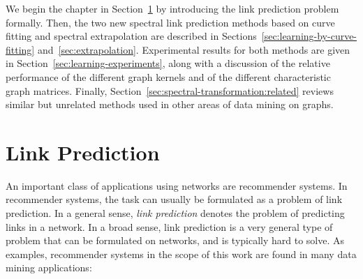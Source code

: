 \documentclass[11pt,a4paper]{book}
\begin{document}
We begin the chapter in Section~\ref{sec:link-prediction} by introducing
the link prediction problem formally.  Then, the two new spectral link
prediction methods based on curve fitting and spectral extrapolation are
described in Sections~\ref{sec:learning-by-curve-fitting} 
and~\ref{sec:extrapolation}.  Experimental results for both methods are
given in Section~\ref{sec:learning-experiments}, along with a discussion
of the relative performance of the different graph kernels and of the
different characteristic graph matrices.  Finally, 
Section~\ref{sec:spectral-transformation:related} reviews similar but
unrelated methods used in other areas of data mining on graphs. 

\section{Link Prediction}
\label{sec:link-prediction}
An important class of applications using networks are recommender
systems.  In recommender systems, the task can usually be formulated as
a problem of link prediction. 
In a general sense, \emph{link prediction} denotes the problem 
of predicting links in a network.  
In a broad sense, link prediction is
a very general type of problem that can be formulated on
networks, and is typically hard to solve. 
As examples, recommender systems in the scope of this work are found in
many data mining applications: 
\end{document}
